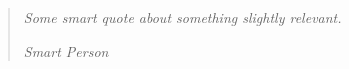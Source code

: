 \documentclass[thesis.tex]{subfiles}
\begin{document}
\chapter*{}
\null\vfill
\begin{quotation}
\em %
Some smart quote about something slightly relevant.

\em
\medskip
\raggedleft
Smart Person
\end{quotation}
\vfill\vfill
\end{document}
